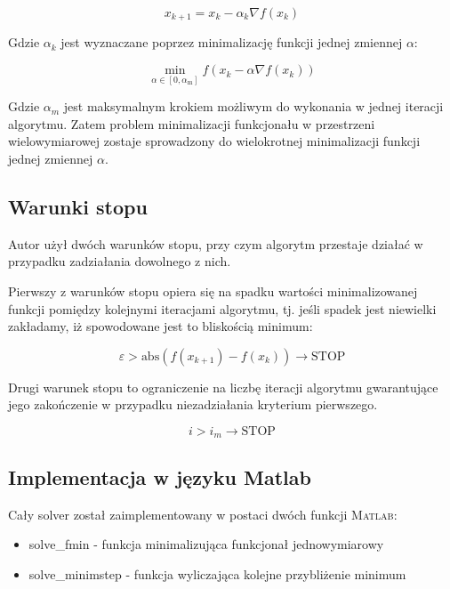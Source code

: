 \documentclass[12pt]{article}
\begin{document}
\begin{equation}
    x_{k+1} = x_{k} - \alpha_{k} \nabla f(x_{k})
\end{equation}

Gdzie $\alpha_{k}$ jest wyznaczane poprzez minimalizację funkcji jednej
zmiennej $\alpha$:

\begin{equation}
    \min_{\alpha \in [0, \alpha_{\textrm{m}}]} f(x_{k} - \alpha \nabla
    f(x_{k}))
\end{equation}

Gdzie $\alpha_{m}$ jest maksymalnym krokiem możliwym do wykonania w jednej
iteracji algorytmu. Zatem problem minimalizacji funkcjonału w przestrzeni
wielowymiarowej zostaje sprowadzony do wielokrotnej minimalizacji funkcji
jednej zmiennej $\alpha$.

\subsection*{Warunki stopu}

Autor użył dwóch warunków stopu, przy czym algorytm przestaje działać w
przypadku zadziałania dowolnego z nich.

Pierwszy z warunków stopu opiera się na spadku wartości minimalizowanej funkcji
pomiędzy kolejnymi iteracjami algorytmu, tj. jeśli spadek jest niewielki
zakładamy, iż spowodowane jest to bliskością minimum:

\begin{equation}
    \varepsilon > \textrm{abs} (f(x_{k+1}) - f(x_{k})) \rightarrow \textrm{STOP}
\end{equation}

\newpage

Drugi warunek stopu to ograniczenie na liczbę iteracji algorytmu gwarantujące
jego zakończenie w przypadku niezadziałania kryterium pierwszego.

\begin{equation}
    i > i_{m} \rightarrow \textrm{STOP}
\end{equation}

\subsection*{Implementacja w języku Matlab}

Cały solver został zaimplementowany w postaci dwóch funkcji \textsc{Matlab}:

\begin{itemize}
  \item solve\_fmin - funkcja minimalizująca funkcjonał jednowymiarowy
  \item solve\_minimstep - funkcja wyliczająca kolejne przybliżenie minimum
\end{itemize}
\end{document}
